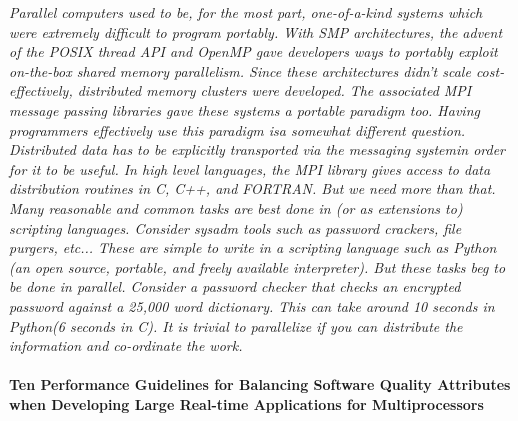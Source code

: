 \documentclass{article}
\begin{document}
{\emph{Parallel computers used to be, for the most part, one-of-a-kind systems
which were extremely difficult to program portably. With SMP architectures, the
advent of the POSIX thread API and OpenMP gave developers ways to portably
exploit on-the-box shared memory parallelism. Since these architectures
didn't scale cost-effectively, distributed memory clusters were developed. The
associated MPI message passing libraries gave these systems a portable paradigm
too. Having programmers effectively use this paradigm isa somewhat different
question. Distributed data has to be explicitly transported via the messaging
systemin order for it to be useful. In high level languages, the MPI library
gives access to data distribution routines in C, C++, and FORTRAN. But we need
more than that. Many reasonable and common tasks are best done in (or as
extensions to) scripting languages. Consider sysadm tools such as password
crackers, file purgers, etc... These are simple to write in a scripting
language such as Python (an open source, portable, and freely available
interpreter). But these tasks beg to be done in parallel. Consider a
password checker that checks an encrypted password against a 25,000 word
dictionary. This can take around 10 seconds in Python(6 seconds in C). It is
trivial to parallelize if you can distribute the information and co-ordinate
the work.}

\paragraph{Ten Performance Guidelines for Balancing Software Quality Attributes
when Developing Large Real-time Applications for Multiprocessors}
\cite{haggander1999guidelines}

}
\end{document}

